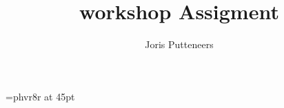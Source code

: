 

\font\myfont=phvr8r at 45pt
\title{{\myfont workshop Assigment}}
\author{Joris Putteneers}
\date{}

\pagestyle{mypagestyle}


\maketitle


%



